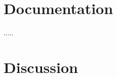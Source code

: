 \documentclass[12pt]{article}
\begin{document}






\newpage
\section{Documentation} %

.....

\newpage
\section{Discussion} %
\end{document}

